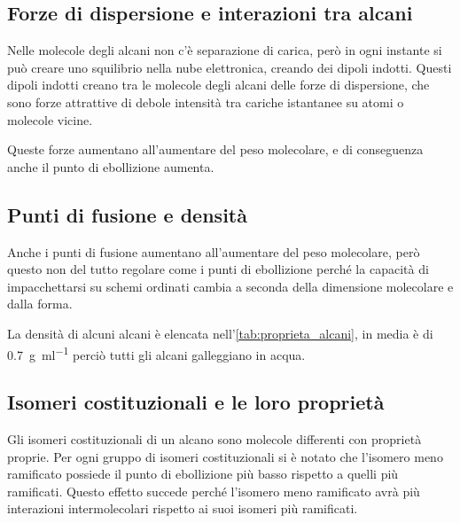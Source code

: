 \subsection{Forze di dispersione e interazioni tra alcani}
Nelle molecole degli alcani non c'è separazione di carica, però in ogni instante si può creare uno squilibrio nella nube elettronica, creando dei dipoli indotti. Questi dipoli indotti creano tra le molecole degli alcani delle forze di dispersione, che sono forze attrattive di debole intensità tra cariche istantanee su atomi o molecole vicine.

Queste forze aumentano all'aumentare del peso molecolare, e di conseguenza anche il punto di ebollizione aumenta.

\subsection{Punti di fusione e densità}
Anche i punti di fusione aumentano all'aumentare del peso molecolare, però questo non del tutto regolare come i punti di ebollizione perché la capacità di impacchettarsi su schemi ordinati cambia a seconda della dimensione molecolare e dalla forma.

La densità di alcuni alcani è elencata nell'\autoref{tab:proprieta_alcani}, in media è di \qty{0.7}{\g\per\ml} perciò tutti gli alcani galleggiano in acqua.

\subsection{Isomeri costituzionali e le loro proprietà}
Gli isomeri costituzionali di un alcano sono molecole differenti con proprietà proprie. Per ogni gruppo di isomeri costituzionali si è notato che l'isomero meno ramificato possiede il punto di ebollizione più basso rispetto a quelli più ramificati. Questo effetto succede perché l'isomero meno ramificato avrà più interazioni intermolecolari rispetto ai suoi isomeri più ramificati.

